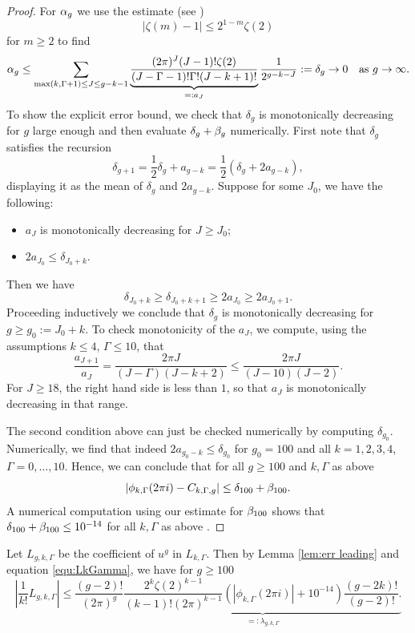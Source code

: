 \documentclass[12pt]{amsart}
\theoremstyle{definition}
\numberwithin{equation}{section}
\newcommand{\numcheck}[1]{\cite[Computation #1]{SupplementaryNotebook}}
\theoremstyle{definition} %
\theoremstyle{remark}
\begin{document}
\begin{proof}
  For $\alpha_{g}$ we use the estimate (see \cite[Proof of Proposition 9.4]{Borinsky})
  \[
  |\zeta(m)-1|\leq 2^{1-m}\zeta(2) 
  \]
  for $m\geq 2$
  to find 
  \[
    \alpha_{g}\leq \sum_{\max(k,\Gamma+1)\leq J\leq g-k-1} 
    \underbrace{\frac{(2\pi)^J (J-1)!\zeta(2)}{ (J-\Gamma-1)! \Gamma!(J-k+1)!}}_{=:a_J}
    \frac{1}{2^{g-k-J}}:= \delta_{g} \to 0 \quad\text{as $g\to \infty$}.
  \]
  To show the explicit error bound, we check that $\delta_g$ is monotonically decreasing for $g$ large enough and then evaluate $\delta_g+\beta_{g}$ numerically.
  First note that $\delta_g$ satisfies the recursion
\[
    \delta_{g+1} = \frac12\delta_g+a_{g-k} =
    \frac12(\delta_g+2a_{g-k}),
\]
displaying it as the mean of $\delta_g$ and $2a_{g-k}$. Suppose for some $J_0$, we have the following:
\begin{itemize}
\item $a_J$ is monotonically decreasing for $J\geq J_0$;
\item $2a_{J_0} \leq \delta_{J_0+k}$.
\end{itemize}
Then we have 
\[
    \delta_{J_0+k}\geq \delta_{J_0+k+1} \geq 2 a_{J_0}
    \geq 2 a_{J_0+1}.
\]
Proceeding inductively we conclude that $\delta_{g}$ is monotonically decreasing for $g\geq g_0:=J_0+k$.
To check monotonicity of the $a_J$, we compute, using the assumptions $k\leq 4$, $\Gamma\leq 10$, that
\[
\frac{a_{J+1}}{a_J} = \frac{2\pi J}{(J - \Gamma)(J - k + 2)}
\leq 
\frac{2\pi J}{(J - 10)(J - 2)}.
\]
For $J\geq 18$, the right hand side is less than $1$, so that $a_J$ 
is monotonically decreasing in that range.

The second condition above can just be checked numerically by computing $\delta_{g_0}$.
Numerically, we find that indeed $2a_{g_0-k}\leq \delta_{g_0}$ for $g_0=100$ and all $k=1,2,3,4$, $\Gamma=0,\dots,10$.
Hence, we can conclude that for all $g\geq 100$ and $k,\Gamma$ as above
\[
    |\phi_{k,\Gamma}(2\pi i)-C_{k,\Gamma,g}| \leq
    \delta_{100} + \beta_{100}.
\]
A numerical computation using our estimate for $\beta_{100}$ shows that $\delta_{100} + \beta_{100}\leq 10^{-14}$ for all $k,\Gamma$ as above \numcheck{CKASYMP}.
\end{proof}

Let $L_{g,k,\Gamma}$ be the coefficient of $u^g$ in $L_{k,\Gamma}$.
Then by Lemma \ref{lem:err leading} and equation \eqref{equ:LkGamma}, we have for $g\geq 100$
\begin{equation}\label{equ:la def}
    \left|\frac{1}{k!} L_{g,k,\Gamma}\right|
    \leq 
    \frac{(g-2)!}{(2\pi)^g}
    \underbrace{
        \frac{2^k\zeta(2)^{k-1}}{(k-1)!(2\pi)^{k-1}}
    (|\phi_{k,\Gamma}(2\pi i)| + 10^{-14})
    \frac{(g-2k)!}{(g-2)!}.
    }_{=:\lambda_{g,k,\Gamma}}
\end{equation}
\end{document}
